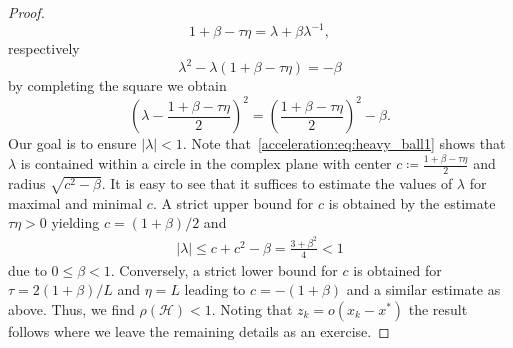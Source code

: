 \begin{proof}
    \begin{equation}
        1+\beta -\tau \eta = \lambda + \beta\lambda^{-1},
    \end{equation}
    respectively
    \begin{equation}
        \lambda^2 - \lambda(1+\beta -\tau \eta) = -\beta
    \end{equation}
    by completing the square we obtain
    \begin{equation}\label{acceleration:eq:heavy_ball1}
        \left(\lambda - \frac{1+\beta -\tau \eta}{2}\right)^2 = \left(\frac{1+\beta -\tau \eta}{2}\right)^2 - \beta.
    \end{equation}
    Our goal is to ensure $|\lambda|<1$. Note that~\eqref{acceleration:eq:heavy_ball1} shows that $\lambda$ is contained within a circle in the complex plane with center $c \coloneqq \frac{1+\beta -\tau \eta}{2}$ and radius $\sqrt{c^2 - \beta}$. It is easy to see that it suffices to estimate the values of $\lambda$ for maximal and minimal $c$.
    A strict upper bound for $c$ is obtained by the estimate $\tau\eta>0$ yielding $c = (1+\beta)/2$ and 
    \begin{equation}
        \begin{aligned}
            |\lambda|\leq c+c^2-\beta = \frac{3+\beta^2}{4}<1
        \end{aligned}
    \end{equation}
    due to $0\leq \beta<1$.
    Conversely, a strict lower bound for $c$ is obtained for $\tau = 2(1+\beta)/L$ and $\eta = L$ leading to $c = -(1+\beta)$ and a similar estimate as above. Thus, we find $\rho(\mathcal{H})<1$. Noting that $z_k = o(x_k-x^*)$ the result follows where we leave the remaining details as an exercise.
\end{proof}


